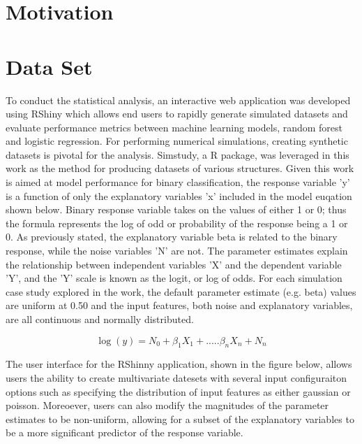 \documentclass{llncs}
\begin{document}
\section{Motivation}



\section{Data Set}

To conduct the statistical analysis, an interactive web application was developed using RShiny which allows end users to rapidly generate simulated datasets and evaluate performance metrics between machine learning models, random forest and logistic regression. For performing numerical simulations, creating synthetic datasets is pivotal for the analysis. Simstudy, a R package, was leveraged in this work as the method for producing datasets of various structures. Given this work is aimed at model performance for binary classification, the response variable 'y' is a function of only the explanatory variables 'x' included in the model euqation shown below. Binary response variable takes on the values of either 1 or 0; thus the formula represents the log of odd or probability of the response being a 1 or 0. As previously stated, the explanatory variable beta is related to the binary response, while the noise variables 'N' are not. The parameter estimates explain the relationship between independent variables 'X' and the dependent variable 'Y', and the 'Y' scale is known as the logit, or log of odds. For each simulation case study explored in the work, the default parameter estimate (e.g. beta) values are uniform at 0.50 and the input features, both noise and explanatory variables, are all continuous and normally distributed. 


\begin{equation}
\log(y) = N_{0} + \beta_{1}X_{1} + .....\beta_{n}X_{n} + N_{n} 
\end{equation}

The user interface for the RShinny application, shown in the figure below, allows users the ability to create multivariate datesets with several input configuraiton options such as specifying the distribution of input features as either gaussian or poisson. Moreoever, users can also modify the magnitudes of the parameter estimates to be non-uniform, allowing for a subset of the explanatory variables to be a more significant predictor of the response variable. 
\end{document}
